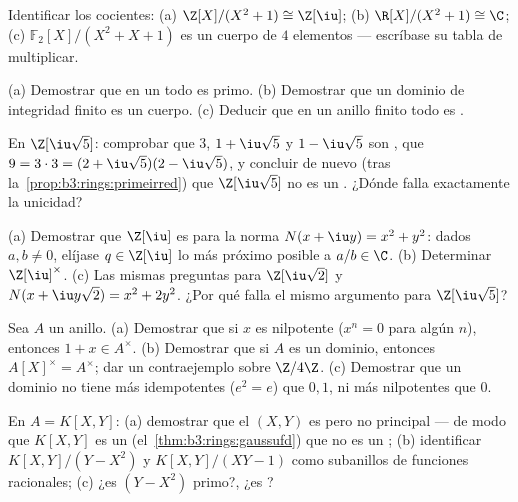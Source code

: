 \begin{exercise}[$\star$]\label{exo:b3:rings:1}
Identificar los cocientes: (a) $\Z[X]/(X^2 + 1) \cong \Z[\iu]$;
(b) $\R[X]/(X^2+1) \cong \C$; (c) $\mathbb F_2[X]/(X^2 + X + 1)$
es un cuerpo de $4$ elementos --- escríbase su tabla de multiplicar.
\end{exercise}

\begin{exercise}[$\star$]\label{exo:b3:rings:2}
(a) Demostrar que en un  todo
 es primo. (b)
Demostrar que un dominio de integridad finito es un cuerpo. (c) Deducir
que en un anillo finito todo  es .
\end{exercise}

\begin{exercise}[$\star$]\label{exo:b3:rings:3}
En $\Z[\iu\sqrt5]$: comprobar que $3$, $1 + \iu\sqrt5$ y $1 -
\iu\sqrt5$ son , que
$9 = 3\cdot 3 = (2 +
\iu\sqrt5)(2 - \iu\sqrt5)$, y concluir de nuevo (tras
la~\cref{prop:b3:rings:primeirred}) que $\Z[\iu\sqrt5]$ no es un
. ¿Dónde falla exactamente la unicidad?
\end{exercise}

\begin{exercise}[$\star\star$]\label{exo:b3:rings:4}
(a) Demostrar que $\Z[\iu]$ es 
para la norma $N(x + \iu y) =
x^2 + y^2$: dados $a, b \neq 0$, elíjase $q \in \Z[\iu]$ lo más próximo
posible a $a/b \in \C$. (b) Determinar $\Z[\iu]^\times$. (c) Las mismas
preguntas para $\Z[\iu\sqrt2]$ y $N(x + \iu y\sqrt2) =
x^2 + 2y^2$. ¿Por qué falla el mismo argumento para
$\Z[\iu\sqrt5]$?
\end{exercise}

\begin{exercise}[$\star\star$]\label{exo:b3:rings:5}
Sea $A$ un anillo. (a) Demostrar que si $x$ es nilpotente ($x^n = 0$
para algún $n$), entonces $1 + x \in A^\times$. (b) Demostrar que si $A$
es un dominio, entonces $A[X]^\times = A^\times$; dar un contraejemplo
sobre $\Z/4\Z$. (c) Demostrar que un dominio no tiene más idempotentes
($e^2 = e$) que $0, 1$, ni más nilpotentes que $0$.
\end{exercise}

\begin{exercise}[$\star\star$]\label{exo:b3:rings:6}
En $A = K[X, Y]$: (a) demostrar que el
 $(X, Y)$ es
 pero no principal --- de
modo que $K[X,Y]$ es un 
(el~\cref{thm:b3:rings:gaussufd}) que no es un
; (b) identificar $K[X, Y]/(Y - X^2)$ y
$K[X,Y]/(XY - 1)$ como subanillos de funciones racionales; (c) ¿es
$(Y - X^2)$ primo?, ¿es ?
\end{exercise}

